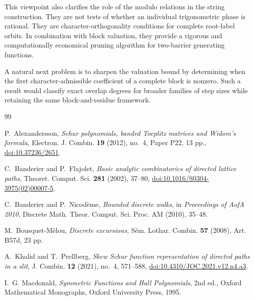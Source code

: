 \documentclass[11pt]{amsart}
\theoremstyle{remark}
\begin{document}
This viewpoint also clarifies the role of the modulo relations in the string construction.  They are not tests of whether an individual trigonometric phase is rational.  They are character-orthogonality conditions for complete root-label orbits.  In combination with block valuation, they provide a rigorous and computationally economical pruning algorithm for two-barrier generating functions.

A natural next problem is to sharpen the valuation bound by determining when the first character-admissible coefficient of a complete block is nonzero.  Such a result would classify exact overlap degrees for broader families of step sizes while retaining the same block-and-residue framework.

\begin{thebibliography}{99}

P.~Alexandersson,
\emph{Schur polynomials, banded Toeplitz matrices and Widom's formula},
Electron. J. Combin. \textbf{19} (2012), no.~4, Paper P22, 13 pp.,
\href{https://doi.org/10.37236/2651}{doi:10.37236/2651}.

C.~Banderier and P.~Flajolet,
\emph{Basic analytic combinatorics of directed lattice paths},
Theoret. Comput. Sci. \textbf{281} (2002), 37--80,
\href{https://doi.org/10.1016/S0304-3975(02)00007-5}{doi:10.1016/S0304-3975(02)00007-5}.

C.~Banderier and P.~Nicod\`eme,
\emph{Bounded discrete walks},
in \emph{Proceedings of AofA 2010},
Discrete Math. Theor. Comput. Sci. Proc. AM (2010), 35--48.

M.~Bousquet-M\'elou,
\emph{Discrete excursions},
S\'em. Lothar. Combin. \textbf{57} (2008), Art. B57d, 23 pp.


A.~Khalid and T.~Prellberg,
\emph{Skew Schur function representation of directed paths in a slit},
J. Combin. \textbf{12} (2021), no.~4, 571--588,
\href{https://doi.org/10.4310/JOC.2021.v12.n4.a3}{doi:10.4310/JOC.2021.v12.n4.a3}.

I.~G. Macdonald,
\emph{Symmetric Functions and Hall Polynomials},
2nd ed., Oxford Mathematical Monographs, Oxford University Press, 1995.

\end{thebibliography}
\end{document}
